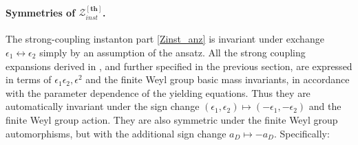 \documentclass[12pt,a4paper]{article}
\numberwithin{equation}{section}
\newcommand{\D}{\scriptscriptstyle{D}}
\begin{document}
\paragraph{Symmetries of $\mathcal{Z}^{[\mathbf{th}]}_{inst}$.} The strong-coupling instanton part \eqref{Zinst_anz} is invariant under exchange $\epsilon_1\leftrightarrow\epsilon_2$ simply by an assumption of the ansatz. All the strong coupling expansions derived in \cite{BST25}, and further specified in the previous section, are expressed in terms of $\epsilon_1\epsilon_2, \epsilon^2$ and the finite Weyl group basic mass invariants, in accordance with the parameter dependence of the yielding equations.
Thus they are automatically invariant under the sign change
$(\epsilon_1,\epsilon_2)\mapsto(-\epsilon_1,-\epsilon_2)$ and the finite Weyl group action. They are also symmetric under the finite Weyl group automorphisms, but with the additional sign change $a_{\D}\mapsto-a_{\D}$. Specifically:
\end{document}
